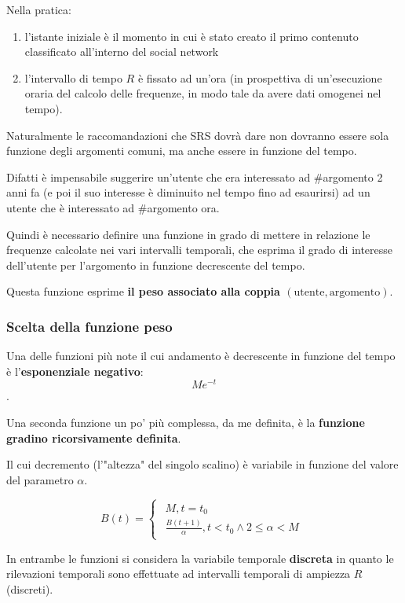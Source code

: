 {Nella pratica:
\begin{enumerate}
    \item l'istante iniziale è il momento in cui è stato creato il primo contenuto classificato all'interno del social network
    \item l'intervallo di tempo $R$ è fissato ad un'ora (in prospettiva di un'esecuzione oraria del calcolo delle frequenze, in modo tale da avere dati omogenei nel tempo).
\end{enumerate}

Naturalmente le raccomandazioni che SRS dovrà dare non dovranno essere sola funzione degli argomenti comuni, ma anche essere in funzione del tempo.


Difatti è impensabile suggerire un'utente che era interessato ad \#argomento 2 anni fa (e poi il suo interesse è diminuito nel tempo fino ad esaurirsi) ad un utente che è interessato ad \#argomento ora. 

Quindi è necessario definire una funzione in grado di mettere in relazione le frequenze calcolate nei vari intervalli temporali, che esprima il grado di interesse dell'utente per l'argomento in funzione decrescente del tempo.

Questa funzione esprime \textbf{il peso associato alla coppia $(\text{utente}, \text{argomento})$}.

\subsubsection{Scelta della funzione peso}
Una delle funzioni più note il cui andamento è decrescente in funzione del tempo è l'\textbf{esponenziale negativo}: $$ Me^{-t} $$.

Una seconda funzione un po' più complessa, da me definita, è la \textbf{funzione gradino ricorsivamente definita}.

Il cui decremento (l'"altezza" del singolo scalino) è variabile in funzione del valore del parametro $\alpha$.

$$ B(t) = \begin{cases} \begin{aligned} M , t = t_0 \\ \frac{B(t + 1)}{\alpha}, t < t_0 \land 2 \leq \alpha <M \end{aligned} \end{cases} $$

In entrambe le funzioni si considera la variabile temporale \textbf{discreta} in quanto le rilevazioni temporali sono effettuate ad intervalli temporali di ampiezza $R$ (discreti).


}

